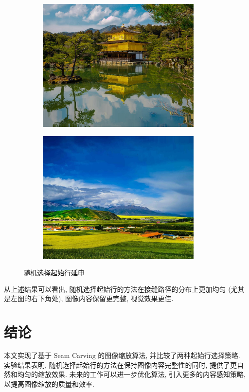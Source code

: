\documentclass[12pt]{article}
\begin{document}
		\begin{figure}[htbp]
			\centering
			\begin{subfigure}{0.33\linewidth}
				\centering
				\includegraphics[width=0.9\textwidth]{figure/pic1_result_rand.jpg}
			\end{subfigure}
			\begin{subfigure}{0.33\linewidth}
				\centering
				\includegraphics[width=0.9\textwidth]{figure/pic2_result_rand.jpg}
			\end{subfigure}
			\caption{随机选择起始行延申}
		\end{figure}

		\noindent
		从上述结果可以看出, 随机选择起始行的方法在接缝路径的分布上更加均匀 (尤其是左图的右下角处), 图像内容保留更完整, 视觉效果更佳.

		\section{结论}
		\noindent
		本文实现了基于 Seam Carving 的图像缩放算法, 并比较了两种起始行选择策略. 实验结果表明, 随机选择起始行的方法在保持图像内容完整性的同时, 提供了更自然和均匀的缩放效果. 未来的工作可以进一步优化算法, 引入更多的内容感知策略, 以提高图像缩放的质量和效率.
\end{document}

